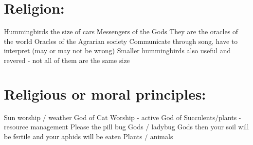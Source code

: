 \documentclass[blue]{GL2020}
\begin{document}
\section{Religion:}

Hummingbirds the size of cars
Messengers of the Gods
They are the oracles of the world
Oracles of the Agrarian society 
Communicate through song, have to interpret (may or may not be wrong)
Smaller hummingbirds also useful and revered - not all of them are the same size

\section{Religious or moral principles:}

Sun worship / weather
God of Cat Worship - active
God of Succulents/plants - resource management
Please the pill bug Gods / ladybug Gods then your soil will be fertile and your aphids will be eaten
Plants / animals
\end{document}
